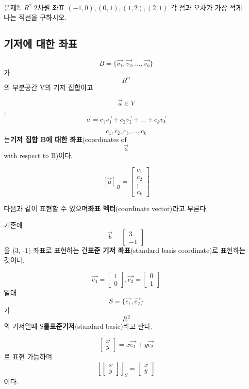 문제2. $R^2$ 2차원 좌표 $(-1, 0), (0, 1), (1, 2), (2, 1)$ 각 점과 오차가 가장 적게 나는 직선을 구하시오.



\newpage
\subsection{기저에 대한 좌표}
\begin{definition} 
$$B = \{\vec{v_1}, \vec{v_2}, ..., \vec{v_k}\}$$가 $$R^n$$의 부분공간 V의 기저 집합이고

$${\vec{a}} \in V$$,  $$\vec{a} = c_1\vec{v_1}+ c_2\vec{v_2} +... + c_k\vec{v_k} $$

$$c_1, c_2, c_3, ..., c_k$$ 는\textbf{기저 집합 B에 대한 좌표}(coordinates of $$\vec{a}$$ with respect to B)이다. 

$$[\vec{a}]_B = \begin{bmatrix} c_1 \\ c_2 \\ \vdots \\ c_k\end{bmatrix} $$

다음과 같이 표현할 수 있으며\textbf{좌표 벡터}(coordinate vector)라고 부른다.
\end{definition}



\begin{definition}  
기존에 $$\vec{b} = \begin{bmatrix} 3 \\ -1 \end{bmatrix}$$을 (3, -1) 좌표로 표현하는 건\textbf{표준 기저 좌표}(standard basis coordinate)로 표현하는 것이다.

$$\vec{e_1} = \begin{bmatrix} 1 \\ 0 \end{bmatrix}, \vec{e_2} = \begin{bmatrix} 0 \\ 1 \end{bmatrix}$$ 일대 $$S = \{\vec{e_1}, \vec{e_2}\}$$가 $$R^2$$ 의 기저일때 S를\textbf{표준기저}(standard basic)라고 한다.

$$\begin{bmatrix} x \\ y \end{bmatrix} = x\vec{e_1}+ y\vec{e_2} $$ 로 표현 가능하며 $$[\begin{bmatrix} x \\ y \end{bmatrix}]_S = \begin{bmatrix} x \\ y \end{bmatrix} $$ 이다.
\end{definition}



